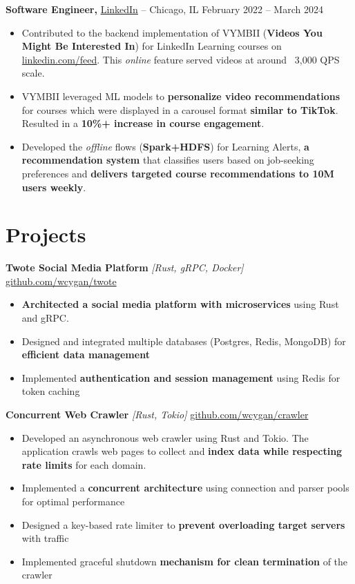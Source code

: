 \documentclass[10pt]{article}
\begin{document}
\textbf{Software Engineer,} \href{https://www.linkedin.com/}{LinkedIn} -- Chicago, IL \hfill February 2022 -- March 2024
\vspace{-4pt}
\begin{itemize}
  \item Contributed to the backend implementation of VYMBII (\textbf{Videos You Might Be Interested In}) for LinkedIn Learning courses on \href{https://linkedin.com/feed}{linkedin.com/feed}. This \textit{online} feature served videos at around ~3,000 QPS scale.
  \item VYMBII leveraged ML models to \textbf{personalize video recommendations} for courses which were displayed in a carousel format \textbf{similar to TikTok}. Resulted in a \textbf{10\%+ increase in course engagement}.
  \item Developed the \textit{offline} flows (\textbf{Spark+HDFS}) for Learning Alerts, \textbf{a recommendation system} that classifies users based on job-seeking preferences and \textbf{delivers targeted course recommendations to 10M users weekly}. 
\end{itemize}

\vspace{5pt}

\section*{Projects}
\vspace{4pt}
\textbf{Twote Social Media Platform} \textit{[Rust, gRPC, Docker]} \hfill \href{https://github.com/wcygan/twote}{github.com/wcygan/twote}
\vspace{-4pt}
\begin{itemize}
  \item \textbf{Architected a social media platform with microservices} using Rust and gRPC.
  \item Designed and integrated multiple databases (Postgres, Redis, MongoDB) for \textbf{efficient data management}
  \item Implemented \textbf{authentication and session management} using Redis for token caching
\end{itemize}

\textbf{Concurrent Web Crawler} \textit{[Rust, Tokio]} \hfill \href{https://github.com/wcygan/crawler}{github.com/wcygan/crawler}
\vspace{-4pt}
\begin{itemize}
  \item Developed an asynchronous web crawler using Rust and Tokio. The application crawls web pages to collect and \textbf{index data while respecting rate limits} for each domain.
  \item Implemented a \textbf{concurrent architecture} using connection and parser pools for optimal performance
  \item Designed a key-based rate limiter to \textbf{prevent overloading target servers} with traffic
  \item Implemented graceful shutdown \textbf{mechanism for clean termination} of the crawler
\end{itemize}
\end{document}

